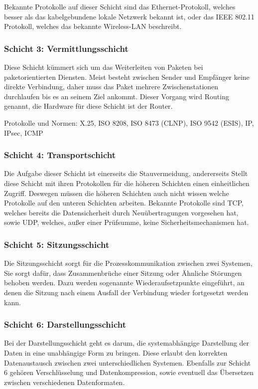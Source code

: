 \documentclass[a4paper,14pt,headsepline]{scrartcl}
\begin{document}
Bekannte Protokolle auf dieser Schicht sind das Ethernet-Protokoll, welches besser als das kabelgebundene lokale Netzwerk bekannt ist, oder das IEEE 802.11 Protokoll, welches das bekannte Wireless-LAN beschreibt.

\subsubsection{Schicht 3: Vermittlungsschicht}
Diese Schicht kümmert sich um das Weiterleiten von Paketen bei paketorientierten Diensten. Meist besteht zwischen Sender und Empfänger keine direkte Verbindung, daher muss das Paket mehrere Zwischenstationen durchlaufen bis es an seinem Ziel ankommt. Dieser Vorgang wird Routing genannt, die Hardware für diese Schicht ist der Router.

Protokolle und Normen: X.25, ISO 8208, ISO 8473 (CLNP), ISO 9542 (ESIS), IP, IPsec, ICMP

\subsubsection{Schicht 4: Transportschicht}
Die Aufgabe dieser Schicht ist einerseits die Stauvermeidung, andererseits Stellt diese Schicht mit ihren Protokollen für die höheren Schichten einen einheitlichen Zugriff. Deswegen müssen die höheren Schichten auch nicht wissen welche Protokolle auf den unteren Schichten arbeiten. Bekannte Protokolle sind TCP, welches bereits die Datensicherheit durch Neuübertragungen vorgesehen hat, sowie UDP, welches, außer einer Prüfsumme, keine Sicherheitsmechanismen hat.

\subsubsection{Schicht 5: Sitzungsschicht}
Die Sitzungsschicht sorgt für die Prozesskommunikation zwischen zwei Systemen, Sie sorgt dafür, dass Zusammenbrüche einer Sitzung oder Ähnliche Störungen behoben werden. Dazu werden sogenannte Wiederaufsetzpunkte eingeführt, an denen die Sitzung nach einem Ausfall der Verbindung wieder fortgesetzt werden kann.

\subsubsection{Schicht 6: Darstellungsschicht}
Bei der Darstellungsschicht geht es darum, die systemabhängige Darstellung der Daten in eine unabhängige Form zu bringen. Diese erlaubt den korrekten Datenaustausch zwischen zwei unterschiedlichen Systemen. Ebenfalls zur Schicht 6 gehören Verschlüsselung und Datenkompression, sowie eventuell das Übersetzen zwischen verschiedenen Datenformaten.
\end{document}
